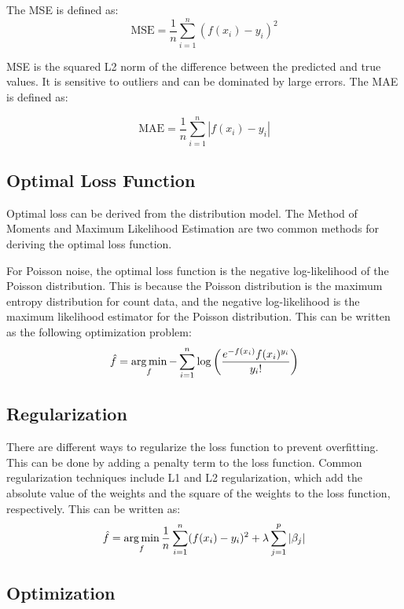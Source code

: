 The MSE is defined as:
\begin{equation}
    \text{MSE} = \frac{1}{n} \sum_{i=1}^{n} (f(x_i) - y_i)^{2}
\end{equation}

MSE is the squared L2 norm of the difference between the predicted and true values. It is sensitive to outliers and can be dominated by large errors. The MAE is defined as:

\begin{equation}
    \text{MAE} = \frac{1}{n} \sum_{i=1}^{n} \left| f(x_i) - y_i \right|
\end{equation}

\subsection{Optimal Loss Function}
Optimal loss can be derived from the distribution model. The Method of Moments and Maximum Likelihood Estimation are two common methods for deriving the optimal loss function. 

For Poisson noise, the optimal loss function is the negative log-likelihood of the Poisson distribution. This is because the Poisson distribution is the maximum entropy distribution for count data, and the negative log-likelihood is the maximum likelihood estimator for the Poisson distribution.
This can be written as the following optimization problem:
\begin{equation}
    \hat{f} = \operatorname*{arg\,min}_f -\sum_{i=1}^{n} \log \left( \frac{e^{-f(x_i)} f(x_i)^{y_i}}{y_i!} \right)
\end{equation}


\subsection{Regularization}
There are different ways to regularize the loss function to prevent overfitting. This can be done by adding a penalty term to the loss function. Common regularization techniques include L1 and L2 regularization, which add the absolute value of the weights and the square of the weights to the loss function, respectively. This can be written as:
\begin{equation}
    \hat{f} = \operatorname*{arg\,min}_f \frac{1}{n} \sum_{i=1}^{n} (f(x_i) - y_i)^{2} + \lambda \sum_{j=1}^{p} \left| \beta_j \right|
\end{equation}

\subsection{Optimization}
